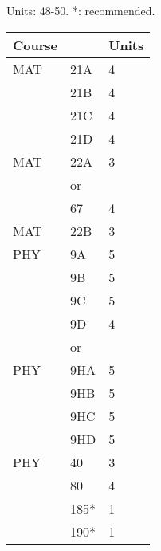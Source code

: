 \documentclass[12pt]{article}
\begin{document}
\noindent
\vskip 0.25cm
\begin{center}
Units:  48-50. *: recommended.\\
\begin{tabular}{|lll|}
\hline
Course & & Units \\
\hline
MAT & 21A & 4 \\  
    & 21B & 4 \\ 
    & 21C & 4 \\ 
    & 21D & 4 \\
\hline
MAT & 22A & 3 \\
    & or  &   \\
    & 67  & 4 \\
\hline
MAT & 22B & 3 \\ 
\hline
\hline
PHY & 9A & 5 \\  
    & 9B & 5 \\  
    & 9C & 5 \\  
    & 9D & 4 \\  
\hline
&or&\\
\hline
PHY & 9HA & 5 \\  
    & 9HB & 5 \\  
    & 9HC & 5 \\  
    & 9HD & 5 \\  
\hline
\hline
PHY & 40   & 3 \\
    & 80   & 4 \\ 
    & 185* & 1 \\ 
    & 190* & 1 \\ 
\hline
\end{tabular}
\end{center}
\end{document}
